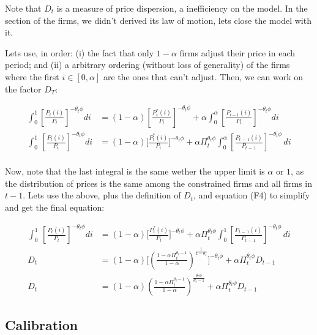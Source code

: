 \documentclass[12pt]{article}
\begin{document}
Note that $D_t$ is a measure of price dispersion, a inefficiency on the model. In the section of the firms, we didn't derived its law of motion, lets close the model with it.

Lets use, in order: (i) the fact that only $1-\alpha$ firms adjust their price in each period; and (ii) a arbitrary ordering (without loss of generality) of the firms where the first $i \in [0,\alpha]$ are the ones that can't adjust. Then, we can work on the factor $D_T$:

\begin{align*}
    \int_{0}^{1}\left[{\frac{P_{t}(i)}{P_{t}}}\right]^{-\theta_{t}\phi}d i &=(1-\alpha)\left[{\frac{P_{t}^{*}(i)}{P_{t}}}\right]^{-\theta_{t}\phi}+\alpha\int_{0}^{\alpha}\left[{\frac{P_{t-1}(i)}{P_{t}}}\right]^{-\theta_{t}\phi}d i\\
    \int_{0}^{1}\,\left[\frac{P_{t}(i)}{P_{t}}\right]^{-\theta_{t}\phi}\!d i &=(1-\alpha)\biggl[\frac{P_{t}^{*}(i)}{P_{t}}\biggr]^{-\theta_{t}\phi}+\alpha \Pi_{t}^{\theta_{t}\phi}\int_{0}^{\alpha}\left[\frac{P_{t\,-\,1}(i)}{P_{t\,-\,1}}\right]^{-\theta_{t}\phi}\,d i\\
\end{align*}

Now, note that the last integral is the same wether the upper limit is $\alpha$ or $1$, as the distribution of prices is the same among the constrained firms and all firms in $t-1$.
Lets use the above, plus the definition of $D_t$, and equation (F4) to simplify and get the final equation:

\begin{align*}
    \int_{0}^{1}\,\left[\frac{P_{t}(i)}{P_{t}}\right]^{-\theta_{t}\phi}\!d i &=(1-\alpha)\biggl[\frac{P_{t}^{*}(i)}{P_{t}}\biggr]^{-\theta_{t}\phi}+\alpha \Pi_{t}^{\theta_{t}\phi}\int_{0}^{1}\left[\frac{P_{t\,-\,1}(i)}{P_{t\,-\,1}}\right]^{-\theta_{t}\phi}\,d i\\
    D_t &= (1-\alpha)\biggl[\left(\frac{1 - \alpha\Pi_t^{\theta_t-1}}{1-\alpha}\right)^{\frac{1}{1-\theta_t}}\biggr]^{-\theta_{t}\phi} + \alpha \Pi_{t}^{\theta_{t}\phi}D_{t-1}\\
    D_t &= (1-\alpha)\left(\frac{1 - \alpha\Pi_t^{\theta_t-1}}{1-\alpha}\right)^{\frac{\theta_t\phi}{\theta_t-1}} + \alpha \Pi_{t}^{\theta_{t}\phi}D_{t-1} \tag{26}
\end{align*}



\subsection{Calibration}
\end{document}
